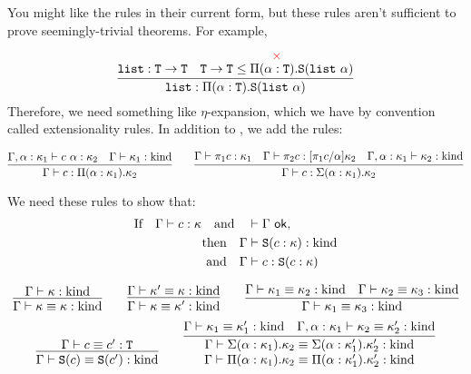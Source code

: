 You might like the rules  in their current form, but
these rules aren't sufficient to prove seemingly-trivial theorems. For example,

\[ \infer{\lst : \Pi(\alpha : \T). \S(\lst~\alpha)}
    {\lst : \T \to \T
    &\deduce{\T \to \T \le \Pi(\alpha : \T) . \S(\lst~\alpha)}{\textcolor{red}{\times}}
    }
\]
Therefore, we need something like $\eta$-expansion, which we have by convention
called extensionality rules. In addition to , we add the rules:
\begin{judgment}
  \[
    \infer{\Gamma \vdash c : \Pi(\alpha : \kappa_1).\kappa_2}
      {\Gamma, \alpha : \kappa_1 \vdash c~\alpha : \kappa_2
      &\Gamma \vdash \kappa_1 : \kind
      }
    \qquad
    \infer{\Gamma \vdash c : \Sigma(\alpha : \kappa_1).\kappa_2}
      {\Gamma \vdash \pi_1c : \kappa_1
      &\Gamma \vdash \pi_2c : [\pi_1c/\alpha]\kappa_2
      &\Gamma, \alpha : \kappa_1 \vdash \kappa_2 : \kind
      }
  \]
\end{judgment}

We need these rules to show that:
\begin{align*}
  \text{If} \quad \Gamma \vdash c : \kappa \quad \text{and} \quad &\vdash \Gamma~\mathsf{ok},\\
  \text{then} \quad \Gamma &\vdash \textnormal{\texttt{S}}(c : \kappa) : \textnormal{kind}\\
  \text{and} \quad \Gamma &\vdash c : \textnormal{\texttt{S}}(c : \kappa)
\end{align*}

\begin{judgment}
  \[
    \infer{\Gamma \vdash \kappa \equiv \kappa : \kind}{\Gamma \vdash \kappa : \kind}
    \qquad
    \infer{\Gamma \vdash \kappa \equiv \kappa' : \kind}
          {\Gamma \vdash \kappa' \equiv \kappa : \kind}
    \qquad
    \infer{\Gamma \vdash \kappa_1 \equiv \kappa_3 : \kind}
          {\Gamma \vdash \kappa_1 \equiv \kappa_2 : \kind
          &\Gamma \vdash \kappa_2 \equiv \kappa_3 : \kind
          }
  \]
  \[
    \infer{\Gamma \vdash \S(c) \equiv \S(c') : \kind}
          {\Gamma \vdash c \equiv c' : \T}
    \qquad
    \infer{
      \deduce
        {\Gamma \vdash \Pi(\alpha : \kappa_1).\kappa_2 \equiv
          \Pi(\alpha : \kappa_1').\kappa_2' : \kind}
        {\Gamma \vdash \Sigma(\alpha : \kappa_1).\kappa_2 \equiv
          \Sigma(\alpha : \kappa_1').\kappa_2' : \kind}}
      {\Gamma \vdash \kappa_1 \equiv \kappa_1' : \kind
      &\Gamma, \alpha : \kappa_1 \vdash \kappa_2 \equiv \kappa_2' : \kind
      }
  \]
\end{judgment}

